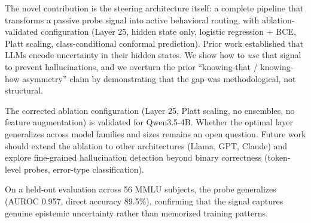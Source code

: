 \documentclass{article}
\begin{document}
The novel contribution is the steering architecture itself: a complete pipeline that transforms a passive probe signal into active behavioral routing, with ablation-validated configuration (Layer 25, hidden state only, logistic regression + BCE, Platt scaling, class-conditional conformal prediction). Prior work established that LLMs encode uncertainty in their hidden states. We show how to \emph{use} that signal to prevent hallucinations, and we overturn the prior ``knowing-that / knowing-how asymmetry'' claim by demonstrating that the gap was methodological, not structural.

The corrected ablation configuration (Layer 25, Platt scaling, no ensembles, no feature augmentation) is validated for Qwen3.5-4B. Whether the optimal layer generalizes across model families and sizes remains an open question. Future work should extend the ablation to other architectures (Llama, GPT, Claude) and explore fine-grained hallucination detection beyond binary correctness (token-level probes, error-type classification).

On a held-out evaluation across 56 MMLU subjects, the probe generalizes (AUROC 0.957, direct accuracy 89.5\%), confirming that the signal captures genuine epistemic uncertainty rather than memorized training patterns.



\end{document}
